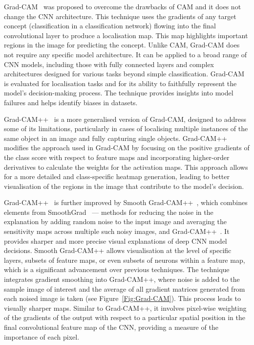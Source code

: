 Grad-CAM~\cite{SelvarajuCDVPB20} was proposed to overcome the drawbacks of CAM and it does not change the CNN architecture. This technique uses the gradients of any target concept (\ie classification in a classification network) flowing into the final convolutional layer to produce a localisation map. This map highlights important regions in the image for predicting the concept. Unlike CAM, Grad-CAM does not require any specific model architecture. It can be applied to a broad range of CNN models, including those with fully connected layers and complex architectures designed for various tasks beyond simple classification. Grad-CAM is evaluated for localisation tasks and for its ability to faithfully represent the model's decision-making process. The technique provides insights into model failures and helps identify biases in datasets.

Grad-CAM++~\cite{ChattopadhyaySH18} is a more generalised version of Grad-CAM, designed to address some of its limitations, particularly in cases of localising multiple instances of the same object in an image and fully capturing single objects. Grad-CAM++ modifies the approach used in Grad-CAM by focusing on the positive gradients of the class score with respect to feature maps and incorporating higher-order derivatives to calculate the weights for the activation maps. This approach allows for a more detailed and class-specific heatmap generation, leading to better visualisation of the regions in the image that contribute to the model's decision.


Grad-CAM++~\cite{ChattopadhyaySH18} is further improved by Smooth Grad-CAM++~\cite{abs-1908-01224}, which combines elements from SmoothGrad~\cite{SmilkovTKVW17} --- methods for reducing the noise in the explanation by adding random noise to the input image and averaging the sensitivity maps across multiple such noisy images, and Grad-CAM++~\cite{ChattopadhyaySH18}. It provides sharper and more precise visual explanations of deep CNN model decisions. Smooth Grad-CAM++ allows visualisation at the level of specific layers, subsets of feature maps, or even subsets of neurons within a feature map, which is a significant advancement over previous techniques. The technique integrates gradient smoothing into Grad-CAM++, where noise is added to the sample image of interest and the average of all gradient matrices generated from each noised image is taken (see Figure~\ref{Fig:Grad-CAM}). This process leads to visually sharper maps. Similar to Grad-CAM++, it involves pixel-wise weighting of the gradients of the output with respect to a particular spatial position in the final convolutional feature map of the CNN, providing a measure of the importance of each pixel.

